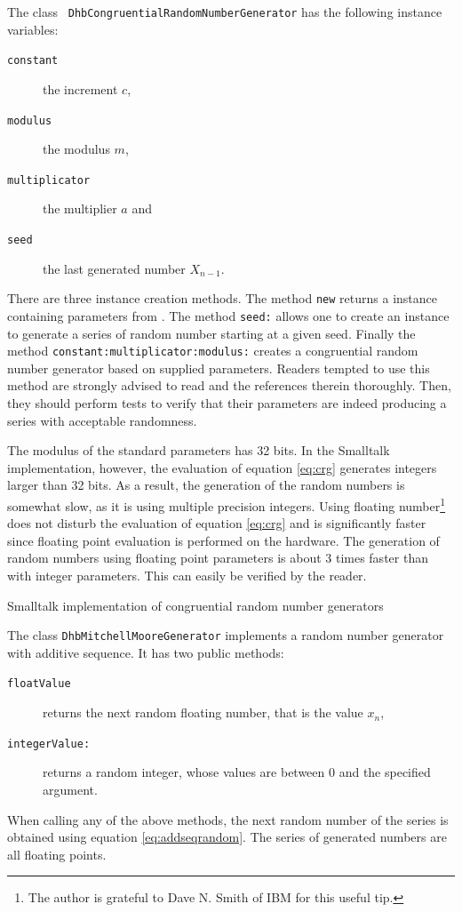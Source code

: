\documentclass[twoside]{book}
\begin{document}
 The class {\tt
DhbCongruentialRandomNumberGenerator} has the following instance
variables:
\begin{description}
  \item[\tt constant] the increment $c$,
  \item[\tt modulus] the modulus $m$,
  \item[\tt multiplicator] the multiplier $a$ and
  \item[\tt seed] the last generated number $X_{n-1}$.
\end{description}
There are three instance creation methods. The method {\tt new}
returns a  instance containing parameters from
\cite{Knuth2}. The method {\tt seed:} allows one to create an
instance to generate a series of random number starting at a given
seed. Finally the method {\tt constant:multiplicator:modulus:}
creates a congruential random number generator based on supplied
parameters. Readers tempted to use this method are strongly
advised to read \cite{Knuth2} and the references therein
thoroughly. Then, they should perform tests to verify that their
parameters are indeed producing a series with acceptable
randomness.

The modulus of the standard parameters has 32 bits. In the
Smalltalk implementation, however, the evaluation of equation
\ref{eq:crg} generates integers larger than 32 bits. As a result,
the generation of the random numbers is somewhat slow, as it is
using multiple precision integers. Using floating
number\footnote{The author is grateful to Dave N. Smith of IBM for
this useful tip.} does not disturb the evaluation of equation
\ref{eq:crg} and is significantly faster since floating point
evaluation is performed on the hardware. The generation of random
numbers using floating point parameters is about 3 times faster
than with integer parameters. This can easily be verified by the
reader.

\begin{listing} Smalltalk implementation of congruential random number generators
\label{ls:randomcong}

\end{listing}

\noindent The class {\tt DhbMitchellMooreGenerator} implements a
random number generator with additive sequence. It has two public
methods:
\begin{description}
  \item[\tt floatValue] returns the next random floating number,
  that is the value $x_n$,
  \item[\tt integerValue:] returns a random integer, whose values
  are between 0 and the specified argument.
\end{description}
When calling any of the above methods, the next random number of
the series is obtained using equation \ref{eq:addseqrandom}. The
series of generated numbers are all floating points.
\end{document}
